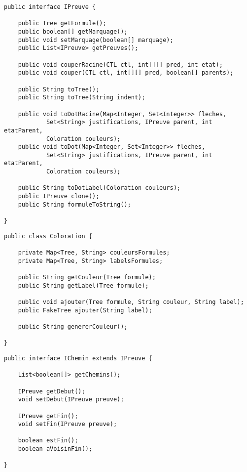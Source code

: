 \documentclass[dvipsnames]{report}
\begin{document}
\newpage

\begin{lstlisting}[caption={Interface \psverb+IPreuve+ commune à toutes les preuves}, label={lst:IPreuve}]
public interface IPreuve {

	public Tree getFormule();
	public boolean[] getMarquage();
	public void setMarquage(boolean[] marquage);
	public List<IPreuve> getPreuves();

	public void couperRacine(CTL ctl, int[][] pred, int etat);
	public void couper(CTL ctl, int[][] pred, boolean[] parents);

	public String toTree();
	public String toTree(String indent);

	public void toDotRacine(Map<Integer, Set<Integer>> fleches,
			Set<String> justifications, IPreuve parent, int etatParent,
			Coloration couleurs);
	public void toDot(Map<Integer, Set<Integer>> fleches,
			Set<String> justifications, IPreuve parent, int etatParent,
			Coloration couleurs);

	public String toDotLabel(Coloration couleurs);
	public IPreuve clone();
	public String formuleToString();

}
\end{lstlisting}

\begin{lstlisting}[caption={Classe \psverb+Coloration+}, label={lst:Coloration}]
public class Coloration {

	private Map<Tree, String> couleursFormules;
	private Map<Tree, String> labelsFormules;

	public String getCouleur(Tree formule);
	public String getLabel(Tree formule);

	public void ajouter(Tree formule, String couleur, String label);
	public FakeTree ajouter(String label);

	public String genererCouleur();

}
\end{lstlisting}

\begin{lstlisting}[caption={Interface \psverb+IChemin+}, label={lst:IChemin}]
public interface IChemin extends IPreuve {

	List<boolean[]> getChemins();

	IPreuve getDebut();
	void setDebut(IPreuve preuve);

	IPreuve getFin();
	void setFin(IPreuve preuve);

	boolean estFin();
	boolean aVoisinFin();

}
\end{lstlisting}
\end{document}
